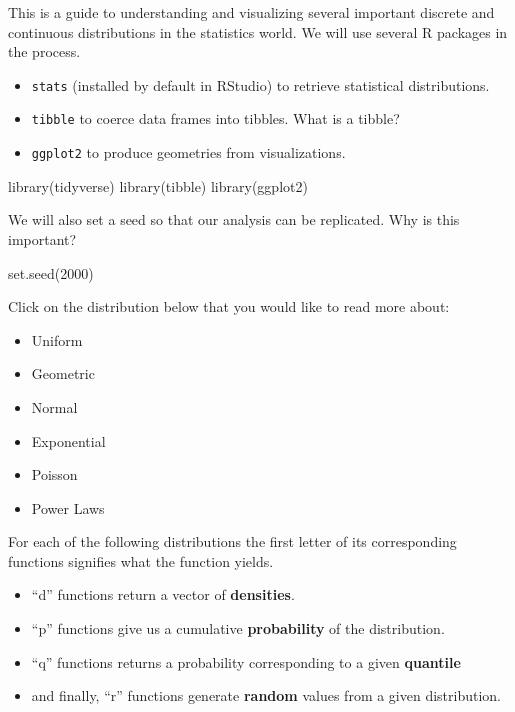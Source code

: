 \documentclass[
]{book}
\newenvironment{Shaded}{\begin{snugshade}}{\end{snugshade}}
\newcommand{\DecValTok}[1]{\textcolor[rgb]{0.00,0.00,0.81}{#1}}
\newcommand{\FunctionTok}[1]{\textcolor[rgb]{0.00,0.00,0.00}{#1}}
\newcommand{\NormalTok}[1]{#1}
\providecommand{\tightlist}{%
  \setlength{\itemsep}{0pt}\setlength{\parskip}{0pt}}
\begin{document}
This is a guide to understanding and visualizing several important discrete and continuous distributions in the statistics world. We will use several R packages in the process.

\begin{itemize}
\tightlist
\item
  \texttt{stats} (installed by default in RStudio) to retrieve statistical distributions.
\item
  \texttt{tibble} to coerce data frames into tibbles. What is a tibble?
\item
  \texttt{ggplot2} to produce geometries from visualizations.
\end{itemize}

\begin{Shaded}
\begin{Highlighting}[]
\FunctionTok{library}\NormalTok{(tidyverse)}
\FunctionTok{library}\NormalTok{(tibble)}
\FunctionTok{library}\NormalTok{(ggplot2)}
\end{Highlighting}
\end{Shaded}

We will also set a seed so that our analysis can be replicated. Why is this important?

\begin{Shaded}
\begin{Highlighting}[]
\FunctionTok{set.seed}\NormalTok{(}\DecValTok{2000}\NormalTok{)}
\end{Highlighting}
\end{Shaded}

Click on the distribution below that you would like to read more about:

\begin{itemize}
\tightlist
\item
  Uniform
\item
  Geometric
\item
  Normal
\item
  Exponential
\item
  Poisson
\item
  Power Laws
\end{itemize}

For each of the following distributions the first letter of its corresponding functions signifies what the function yields.

\begin{itemize}
\item
  ``d'' functions return a vector of \textbf{densities}.
\item
  ``p'' functions give us a cumulative \textbf{probability} of the distribution.
\item
  ``q'' functions returns a probability corresponding to a given \textbf{quantile}
\item
  and finally, ``r'' functions generate \textbf{random} values from a given distribution.
\end{itemize}
\end{document}
